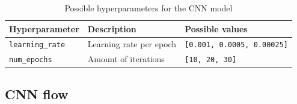 \documentclass{article}
\begin{document}
\begin{table}[ht]
    \centering
    \begin{tabular}{|l|l|l|}
        \hline
        \textbf{Hyperparameter} & \textbf{Description}  & \textbf{Possible values} \\
        \hline
        \texttt{learning\_rate} & Learning rate per epoch & \texttt{[0.001, 0.0005, 0.00025]} \\
        \hline
        \texttt{num\_epochs} & Amount of iterations & \texttt{[10, 20, 30]} \\
        \hline
    \end{tabular}
    \caption{Possible hyperparameters for the CNN model}
\end{table}

\subsection{CNN flow}
\end{document}
